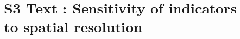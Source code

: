 



\section*{S3 Text : Sensitivity of indicators to spatial resolution}




\begin{figure}[!h]
\centering
\caption{}
\label{fig:stationary}
\end{figure}







